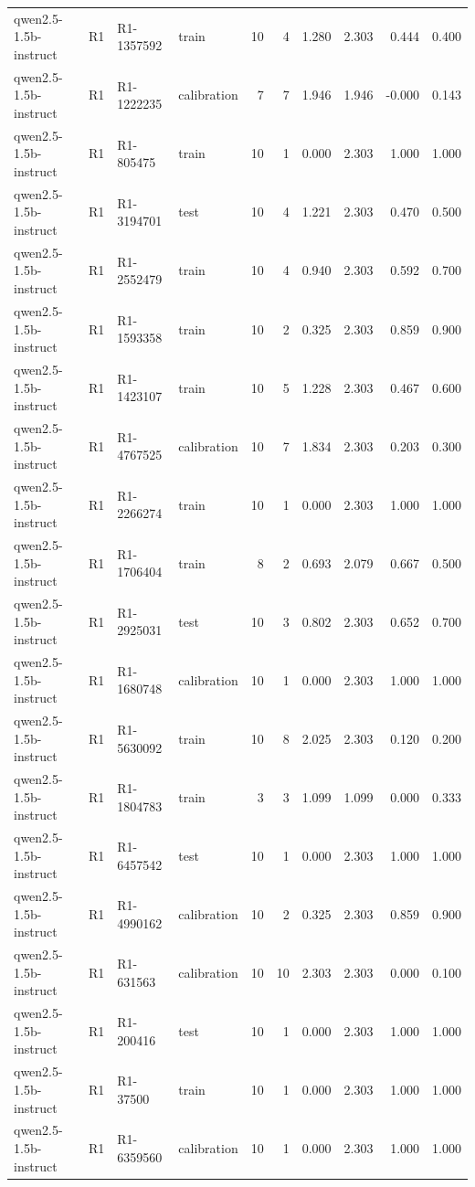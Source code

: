 \begin{table}
\begin{tabular}{llllrrrrrr}
qwen2.5-1.5b-instruct & R1 & R1-1357592 & train & 10 & 4 & 1.280 & 2.303 & 0.444 & 0.400 \\
qwen2.5-1.5b-instruct & R1 & R1-1222235 & calibration & 7 & 7 & 1.946 & 1.946 & -0.000 & 0.143 \\
qwen2.5-1.5b-instruct & R1 & R1-805475 & train & 10 & 1 & 0.000 & 2.303 & 1.000 & 1.000 \\
qwen2.5-1.5b-instruct & R1 & R1-3194701 & test & 10 & 4 & 1.221 & 2.303 & 0.470 & 0.500 \\
qwen2.5-1.5b-instruct & R1 & R1-2552479 & train & 10 & 4 & 0.940 & 2.303 & 0.592 & 0.700 \\
qwen2.5-1.5b-instruct & R1 & R1-1593358 & train & 10 & 2 & 0.325 & 2.303 & 0.859 & 0.900 \\
qwen2.5-1.5b-instruct & R1 & R1-1423107 & train & 10 & 5 & 1.228 & 2.303 & 0.467 & 0.600 \\
qwen2.5-1.5b-instruct & R1 & R1-4767525 & calibration & 10 & 7 & 1.834 & 2.303 & 0.203 & 0.300 \\
qwen2.5-1.5b-instruct & R1 & R1-2266274 & train & 10 & 1 & 0.000 & 2.303 & 1.000 & 1.000 \\
qwen2.5-1.5b-instruct & R1 & R1-1706404 & train & 8 & 2 & 0.693 & 2.079 & 0.667 & 0.500 \\
qwen2.5-1.5b-instruct & R1 & R1-2925031 & test & 10 & 3 & 0.802 & 2.303 & 0.652 & 0.700 \\
qwen2.5-1.5b-instruct & R1 & R1-1680748 & calibration & 10 & 1 & 0.000 & 2.303 & 1.000 & 1.000 \\
qwen2.5-1.5b-instruct & R1 & R1-5630092 & train & 10 & 8 & 2.025 & 2.303 & 0.120 & 0.200 \\
qwen2.5-1.5b-instruct & R1 & R1-1804783 & train & 3 & 3 & 1.099 & 1.099 & 0.000 & 0.333 \\
qwen2.5-1.5b-instruct & R1 & R1-6457542 & test & 10 & 1 & 0.000 & 2.303 & 1.000 & 1.000 \\
qwen2.5-1.5b-instruct & R1 & R1-4990162 & calibration & 10 & 2 & 0.325 & 2.303 & 0.859 & 0.900 \\
qwen2.5-1.5b-instruct & R1 & R1-631563 & calibration & 10 & 10 & 2.303 & 2.303 & 0.000 & 0.100 \\
qwen2.5-1.5b-instruct & R1 & R1-200416 & test & 10 & 1 & 0.000 & 2.303 & 1.000 & 1.000 \\
qwen2.5-1.5b-instruct & R1 & R1-37500 & train & 10 & 1 & 0.000 & 2.303 & 1.000 & 1.000 \\
qwen2.5-1.5b-instruct & R1 & R1-6359560 & calibration & 10 & 1 & 0.000 & 2.303 & 1.000 & 1.000 \\

\end{tabular}
\end{table}
